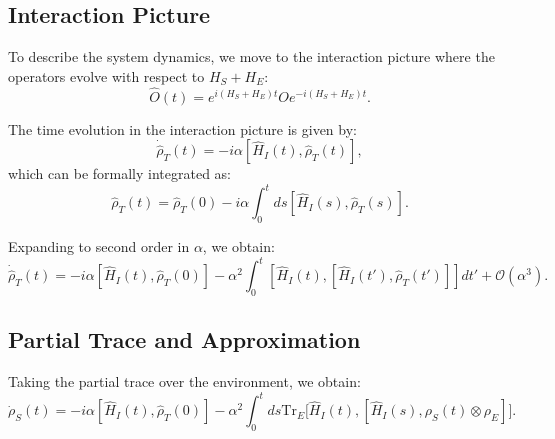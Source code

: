 
\subsection{Interaction Picture}
\label{subsec:Interaction_Picture}

To describe the system dynamics, we move to the interaction picture where the operators evolve with respect to $H_S + H_E$:
\begin{equation}
    \hat{O}(t) = e^{i(H_S+H_E)t} O e^{-i(H_S+H_E)t}.
    \label{eq:Interaction_Picture_Operators}
\end{equation}

The time evolution in the interaction picture is given by:
\begin{equation}
    \dot{\hat{\rho}}_T(t) = -i \alpha [\hat{H}_I(t), \hat{\rho}_T(t)],
    \label{eq:Interaction_Picture_Evolution}
\end{equation}
which can be formally integrated as:
\begin{equation}
    \hat{\rho}_T(t) = \hat{\rho}_T(0) - i \alpha \int_0^t ds [\hat{H}_I(s), \hat{\rho}_T(s)].
    \label{eq:Formal_Integration}
\end{equation}

Expanding to second order in $\alpha$, we obtain:
\begin{equation}
    \dot{\hat{\rho}}_T(t) = -i \alpha \left[ \hat{H}_I(t), \hat{\rho}_T(0) \right] 
    - \alpha^2 \int_0^t \left[ \hat{H}_I(t), \left[ \hat{H}_I(t'), \hat{\rho}_T(t') \right] \right] dt' + \mathcal{O} (\alpha^3).
    \label{eq:Second_Order_Expansion}
\end{equation}


\subsection{Partial Trace and Approximation}
\label{subsec:Partial_Trace_Approximation}

Taking the partial trace over the environment, we obtain:
\begin{equation}
    \dot{\rho}_S(t) = -i \alpha [\hat{H}_I(t),\hat{\rho}_T(0)]  
    - \alpha^2 \int_0^t ds \mathrm{Tr}_E \big[\hat{H}_I(t), [\hat{H}_I(s), \rho_S(t) \otimes \rho_E]\big].
    \label{eq:Partial_Trace_Derivation}
\end{equation}

